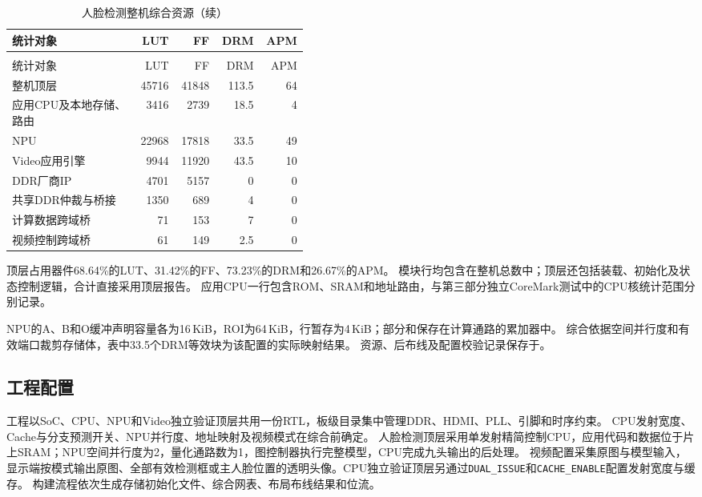\begin{reporttable}
\small
\begin{longtable}{@{}p{0.43\linewidth}rrrr@{}}
\caption{人脸检测整机综合资源}\label{tbl:board-resources}\\
\toprule
统计对象 & LUT & FF & DRM & APM \\
\midrule
\endfirsthead
\caption[]{人脸检测整机综合资源（续）}\\
\toprule
统计对象 & LUT & FF & DRM & APM \\
\midrule
\endhead
\bottomrule
\endfoot
整机顶层 & 45716 & 41848 & 113.5 & 64 \\
应用CPU及本地存储、路由 & 3416 & 2739 & 18.5 & 4 \\
NPU & 22968 & 17818 & 33.5 & 49 \\
Video应用引擎 & 9944 & 11920 & 43.5 & 10 \\
DDR厂商IP & 4701 & 5157 & 0 & 0 \\
共享DDR仲裁与桥接 & 1350 & 689 & 4 & 0 \\
计算数据跨域桥 & 71 & 153 & 7 & 0 \\
视频控制跨域桥 & 61 & 149 & 2.5 & 0 \\
\end{longtable}
\end{reporttable}

顶层占用器件68.64\%的LUT、31.42\%的FF、73.23\%的DRM和26.67\%的APM。
模块行均包含在整机总数中；顶层还包括装载、初始化及状态控制逻辑，合计直接采用顶层报告。
应用CPU一行包含ROM、SRAM和地址路由，与第三部分独立CoreMark测试中的CPU核统计范围分别记录。

NPU的A、B和O缓冲声明容量各为16\,KiB，ROI为64\,KiB，行暂存为4\,KiB；部分和保存在计算通路的累加器中。
综合依据空间并行度和有效端口裁剪存储体，表中33.5个DRM等效块为该配置的实际映射结果。
资源、后布线及配置校验记录保存于。

\subsection{工程配置}

工程以SoC、CPU、NPU和Video独立验证顶层共用一份RTL，板级目录集中管理DDR、HDMI、PLL、引脚和时序约束。
CPU发射宽度、Cache与分支预测开关、NPU并行度、地址映射及视频模式在综合前确定。
人脸检测顶层采用单发射精简控制CPU，应用代码和数据位于片上SRAM；NPU空间并行度为2，量化通路数为1，图控制器执行完整模型，CPU完成九头输出的后处理。
视频配置采集原图与模型输入，显示端按模式输出原图、全部有效检测框或主人脸位置的透明头像。CPU独立验证顶层另通过\texttt{DUAL\_ISSUE}和\texttt{CACHE\_ENABLE}配置发射宽度与缓存。
构建流程依次生成存储初始化文件、综合网表、布局布线结果和位流。

